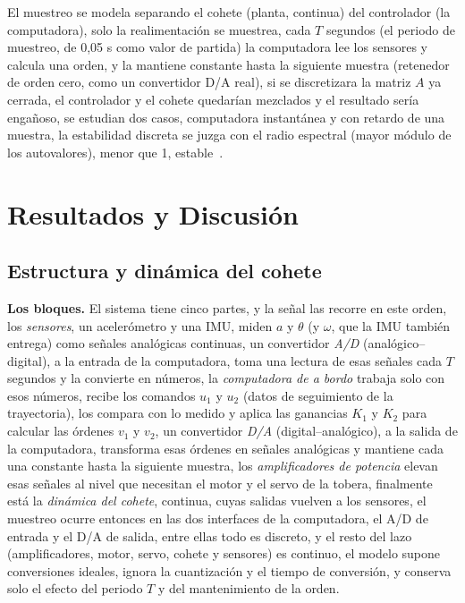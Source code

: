 \documentclass[article, 11pt]{IEEEtran}   %
\begin{document}
El muestreo se modela separando el cohete (planta, continua) del controlador (la computadora), solo la realimentaci\'on se muestrea, cada $T$ segundos (el periodo de muestreo, de 0,05 s como valor de partida) la computadora lee los sensores y calcula una orden, y la mantiene constante hasta la siguiente muestra (retenedor de orden cero, como un convertidor D/A real), si se discretizara la matriz $A$ ya cerrada, el controlador y el cohete quedar\'ian mezclados y el resultado ser\'ia enga\~noso, se estudian dos casos, computadora instant\'anea y con retardo de una muestra, la estabilidad discreta se juzga con el radio espectral (mayor m\'odulo de los autovalores), menor que 1, estable~\cite{franklin}.

\section{Resultados y Discusi\'on}

\subsection*{Estructura y din\'amica del cohete}
\textbf{Los bloques.} El sistema tiene cinco partes, y la se\~nal las recorre en este orden, los \emph{sensores}, un aceler\'ometro y una IMU, miden $a$ y $\theta$ (y $\omega$, que la IMU tambi\'en entrega) como se\~nales anal\'ogicas continuas, un convertidor \emph{A/D} (anal\'ogico--digital), a la entrada de la computadora, toma una lectura de esas se\~nales cada $T$ segundos y la convierte en n\'umeros, la \emph{computadora de a bordo} trabaja solo con esos n\'umeros, recibe los comandos $u_1$ y $u_2$ (datos de seguimiento de la trayectoria), los compara con lo medido y aplica las ganancias $K_1$ y $K_2$ para calcular las \'ordenes $v_1$ y $v_2$, un convertidor \emph{D/A} (digital--anal\'ogico), a la salida de la computadora, transforma esas \'ordenes en se\~nales anal\'ogicas y mantiene cada una constante hasta la siguiente muestra, los \emph{amplificadores de potencia} elevan esas se\~nales al nivel que necesitan el motor y el servo de la tobera, finalmente est\'a la \emph{din\'amica del cohete}, continua, cuyas salidas vuelven a los sensores, el muestreo ocurre entonces en las dos interfaces de la computadora, el A/D de entrada y el D/A de salida, entre ellas todo es discreto, y el resto del lazo (amplificadores, motor, servo, cohete y sensores) es continuo, el modelo supone conversiones ideales, ignora la cuantizaci\'on y el tiempo de conversi\'on, y conserva solo el efecto del periodo $T$ y del mantenimiento de la orden.
\end{document}
